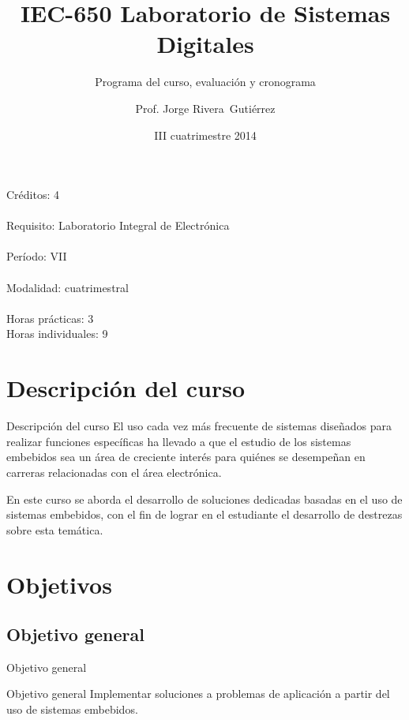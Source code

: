 \documentclass[handout,xcolor=dvipsnames]{beamer}
\title[IEC-650]{IEC-650 Laboratorio de Sistemas Digitales}
\subtitle{Programa del curso, evaluación y cronograma}
\author{Prof. Jorge Rivera~Guti\'errez}
\institute{Universidad Latina de Costa Rica\\ Ingenier\'\i a en Electr\'onica}
\date{III cuatrimestre 2014}
\newcommand{\pageframe}[1]{\frame{\begin{center}{ \Huge #1 }\end{center}}}
\begin{document}
\begin{frame}
 \maketitle
\end{frame}

\begin{frame}
 \begin{center}
  \Large Créditos: 4\\~\\
  Requisito: Laboratorio Integral de Electr\'onica\\~\\
  Período: VII\\~\\
  Modalidad: cuatrimestral\\~\\
  Horas pr\'acticas: 3\\
  Horas individuales: 9
 \end{center}
\end{frame}

\section{Descripción del curso}

\begin{frame}{Descripción del curso}
 El uso cada vez más frecuente de sistemas diseñados para realizar funciones específicas ha llevado a que el estudio de los sistemas embebidos sea un área de creciente interés para quiénes se desempeñan en carreras relacionadas con el área electrónica.

 En este curso se aborda el desarrollo de soluciones dedicadas basadas en el uso de sistemas embebidos, con el fin de lograr en el estudiante el desarrollo de destrezas sobre esta temática.
\end{frame}

\section{Objetivos}

\pageframe{Objetivos}

\subsection{Objetivo general}

\begin{frame}{Objetivo general}
  \begin{block}{Objetivo general}
    Implementar soluciones a problemas de aplicación a partir del uso de sistemas embebidos.
  \end{block}
\end{frame}
\end{document}
